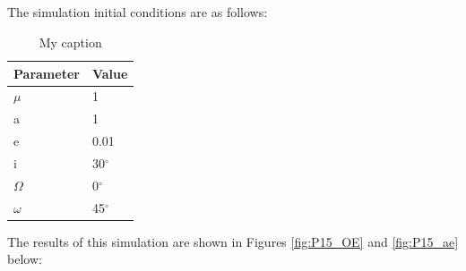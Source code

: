 \documentclass[]{aiaa-tc}%
\begin{document}
\subsection{}
The simulation initial conditions are as follows:
\begin{table}[H]
\centering
\caption{My caption}
\label{my-label}
\begin{tabular}{|l|l|}
\hline
\rowcolor[HTML]{C0C0C0} 
\textbf{Parameter} & \textbf{Value} \\ \hline
$\mu$              & 1              \\ \hline
a                  & 1              \\ \hline
e                  & 0.01           \\ \hline
i                  & 30$^\circ$     \\ \hline
$\Omega$           & 0$^\circ$                \\ \hline
$\omega$           & 45$^\circ$               \\ \hline
\end{tabular}
\end{table}
The results of this simulation are shown in Figures \ref{fig:P15_OE} and \ref{fig:P15_ae} below:
\end{document}
